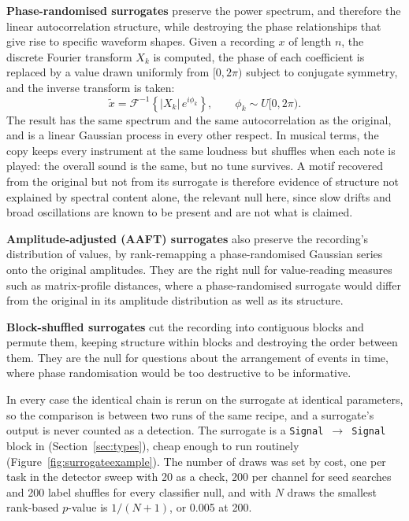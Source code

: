 \textbf{Phase-randomised surrogates} preserve the power spectrum, and therefore the linear autocorrelation structure, while destroying the phase relationships that give rise to specific waveform shapes. Given a recording $x$ of length $n$, the discrete Fourier transform $X_k$ is computed, the phase of each coefficient is replaced by a value drawn uniformly from $[0, 2\pi)$ subject to conjugate symmetry, and the inverse transform is taken:
\begin{equation}
\tilde{x} = \mathcal{F}^{-1}\!\left\{ |X_k| \, e^{i\phi_k} \right\}, \qquad \phi_k \sim U[0,2\pi).
\end{equation}
The result has the same spectrum and the same autocorrelation as the original, and is a linear Gaussian process in every other respect. In musical terms, the copy keeps every instrument at the same loudness but shuffles when each note is played: the overall sound is the same, but no tune survives. A motif recovered from the original but not from its surrogate is therefore evidence of structure not explained by spectral content alone, the relevant null here, since slow drifts and broad oscillations are known to be present and are not what is claimed.

\textbf{Amplitude-adjusted (AAFT) surrogates} \cite{theiler1992surrogate,schreiber2000surrogate} also preserve the recording's distribution of values, by rank-remapping a phase-randomised Gaussian series onto the original amplitudes. They are the right null for value-reading measures such as matrix-profile distances, where a phase-randomised surrogate would differ from the original in its amplitude distribution as well as its structure.

\textbf{Block-shuffled surrogates} cut the recording into contiguous blocks and permute them, keeping structure within blocks and destroying the order between them. They are the null for questions about the arrangement of events in time, where phase randomisation would be too destructive to be informative.

In every case the identical chain is rerun on the surrogate at identical parameters, so the comparison is between two runs of the same recipe, and a surrogate's output is never counted as a detection. The surrogate is a \texttt{Signal $\rightarrow$ Signal} block in \tool{} (Section~\ref{sec:types}), cheap enough to run routinely (Figure~\ref{fig:surrogateexample}). The number of draws was set by cost, one per task in the detector sweep with 20 as a check, 200 per channel for seed searches and 200 label shuffles for every classifier null, and with $N$ draws the smallest rank-based $p$-value is $1/(N+1)$, or 0.005 at 200.

